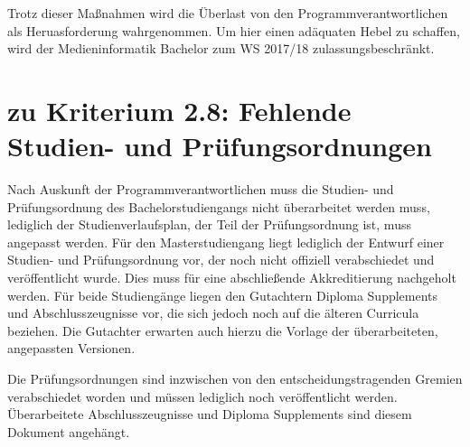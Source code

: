Trotz dieser Maßnahmen wird die Überlast von den
Programmverantwortlichen als Heruasforderung wahrgenommen. Um hier einen
adäquaten Hebel zu schaffen, wird der Medieninformatik Bachelor zum WS
2017/18 zulassungsbeschränkt.

\section{zu Kriterium 2.8: Fehlende Studien- und
Prüfungsordnungen}\label{zu-kriterium-2.8-fehlende-studien--und-pruxfcfungsordnungen}

\begin{siderules}
Nach Auskunft der Programmverantwortlichen muss die Studien- und
Prüfungsordnung des Bachelorstudiengangs nicht überarbeitet werden muss,
lediglich der Studienverlaufsplan, der Teil der Prüfungsordnung ist,
muss angepasst werden. Für den Masterstudiengang liegt lediglich der
Entwurf einer Studien- und Prüfungsordnung vor, der noch nicht offiziell
verabschiedet und veröffentlicht wurde. Dies muss für eine abschließende
Akkreditierung nachgeholt werden. Für beide Studiengänge liegen den
Gutachtern Diploma Supplements und Abschlusszeugnisse vor, die sich
jedoch noch auf die älteren Curricula beziehen. Die Gutachter erwarten
auch hierzu die Vorlage der überarbeiteten, angepassten Versionen.
\end{siderules}

Die Prüfungsordnungen sind inzwischen von den entscheidungstragenden
Gremien verabschiedet worden und müssen lediglich noch veröffentlicht
werden. Überarbeitete Abschlusszeugnisse und Diploma Supplements sind
diesem Dokument angehängt.
